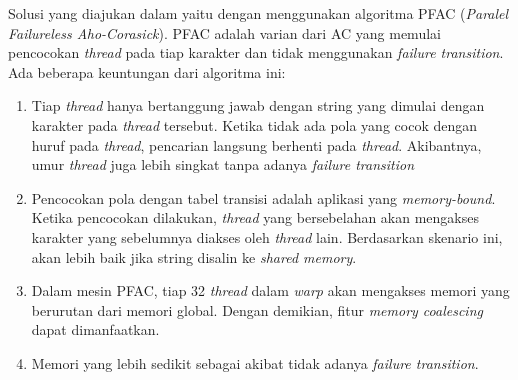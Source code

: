       Solusi yang diajukan dalam \citep{lin2013} yaitu dengan menggunakan algoritma PFAC (\emph{Paralel Failureless Aho-Corasick}). PFAC adalah varian dari AC yang memulai pencocokan \emph{thread} pada tiap karakter dan tidak menggunakan \emph{failure transition}. Ada beberapa keuntungan dari algoritma ini:
    
      \begin{enumerate}

        \item 
        Tiap \emph{thread} hanya bertanggung jawab dengan string yang dimulai dengan karakter pada \emph{thread} tersebut. Ketika tidak ada pola yang cocok dengan huruf pada \emph{thread}, pencarian langsung berhenti pada \emph{thread}. Akibantnya, umur \emph{thread} juga lebih singkat tanpa adanya \emph{failure transition}

        \item
        Pencocokan pola dengan tabel transisi adalah aplikasi yang \emph{memory-bound}. Ketika pencocokan dilakukan, \emph{thread} yang bersebelahan akan mengakses karakter yang sebelumnya diakses oleh \emph{thread} lain. Berdasarkan skenario ini, akan lebih baik jika string disalin ke \emph{shared memory}.

        \item 
        Dalam mesin PFAC, tiap 32 \emph{thread} dalam \emph{warp} akan mengakses memori yang berurutan dari memori global. Dengan demikian, fitur \emph{memory coalescing} dapat dimanfaatkan.

        \item
        Memori yang lebih sedikit sebagai akibat tidak adanya \emph{failure transition}.

      \end{enumerate}



